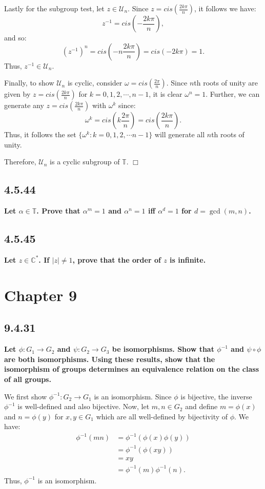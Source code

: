 \documentclass[11pt, a4paper]{article}
\begin{document}
Lastly for the subgroup test, let $z \in \mathcal{U}_{n}$. Since $z = cis \left ( \frac{2k\pi}{n} \right )$, it follows we have:
\[
  z^{-1} = cis \left (- \frac{2k\pi}{n} \right ),
\]
and so:
\[
  (z^{-1})^n = cis \left (-n \frac{2k\pi}{n} \right ) = cis(-2k\pi) = 1.
\]
Thus, $z^{-1} \in \mathcal{U}_{n}$.

Finally, to show $\mathcal{U}_{n}$ is cyclic, consider $\omega = cis \left ( \frac{2\pi}{n} \right )$. Since $n$th roots of unity are given by $z = cis \left ( \frac{2k\pi}{n} \right )$ for $k = 0, 1, 2, \cdots, n - 1$, it is clear $\omega^n = 1$. Further, we can generate any $z = cis \left ( \frac{2k\pi}{n} \right )$ with $\omega^k$ since:
\[
  \omega^k = cis \left (k \frac{2\pi}{n} \right ) = cis \left ( \frac{2k\pi}{n} \right ).
\]
Thus, it follows the set $\{\omega^k : k = 0, 1, 2, \cdots n - 1\}$ will generate all $n$th roots of unity.

Therefore, $\mathcal{U}_{n}$ is a cyclic subgroup of $\mathbb{T}$. $\Box$

\newpage

\subsection{4.5.44}
\textbf{Let $\alpha \in \mathbb{T}$. Prove that $\alpha^m = 1$ and $\alpha^n = 1$ iff $\alpha^d = 1$ for $d = \gcd(m, n)$.}

\subsection{4.5.45}
\textbf{Let $z \in \mathbb{C}^{*}$. If $|z| \neq 1$, prove that the order of $z$ is infinite.}

\newpage 
\section{Chapter 9}

\subsection{9.4.31}
\textbf{Let $\phi : G_1 \rightarrow G_2$ and $\psi : G_2 \rightarrow G_3$ be isomorphisms. Show that $\phi^{-1}$ and $\psi \circ \phi$ are both isomorphisms. Using these results, show that the isomorphism of groups determines an equivalence relation on the class of all groups.}

We first show $\phi^{-1} : G_2 \rightarrow G_1$ is an isomorphism. Since $\phi$ is bijective, the inverse $\phi^{-1}$ is well-defined and also bijective. Now, let $m, n \in G_2$ and define $m = \phi(x)$ and $n = \phi(y)$ for $x, y \in G_1$ which are all well-defined by bijectivity of $\phi$. We have:
\begin{align*}
  \phi^{-1}(mn) &= \phi^{-1}(\phi(x) \phi(y)) \\
                &= \phi^{-1}(\phi(xy)) \\
                &= xy \\
                &= \phi^{-1}(m) \phi^{-1}(n).
\end{align*}
Thus, $\phi^{-1}$ is an isomorphism.
\end{document}
